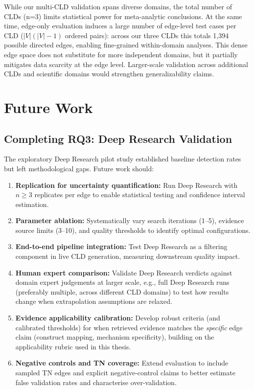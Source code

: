 While our multi-CLD validation spans diverse domains, the total number of CLDs (n=3) limits statistical power for meta-analytic conclusions. At the same time, edge-only evaluation induces a large number of edge-level test cases per CLD ($|V|(|V|-1)$ ordered pairs): across our three CLDs this totals 1,394 possible directed edges, enabling fine-grained within-domain analyses. This dense edge space does not substitute for more independent domains, but it partially mitigates data scarcity at the edge level. Larger-scale validation across additional CLDs and scientific domains would strengthen generalizability claims.

\section{Future Work}
\label{sec:discussion_future}

\subsection{Completing RQ3: Deep Research Validation}

The exploratory Deep Research pilot study established baseline detection rates but left methodological gaps. Future work should:
\begin{enumerate}[noitemsep]
    \item \textbf{Replication for uncertainty quantification:} Run Deep Research with $n \geq 3$ replicates per edge to enable statistical testing and confidence interval estimation.
    \item \textbf{Parameter ablation:} Systematically vary search iterations (1--5), evidence source limits (3--10), and quality thresholds to identify optimal configurations.
    \item \textbf{End-to-end pipeline integration:} Test Deep Research as a filtering component in live CLD generation, measuring downstream quality impact.
    \item \textbf{Human expert comparison:} Validate Deep Research verdicts against domain expert judgements at larger scale, e.g., full Deep Research runs (preferably multiple, across different CLD domains) to test how results change when extrapolation assumptions are relaxed.
    \item \textbf{Evidence applicability calibration:} Develop robust criteria (and calibrated thresholds) for when retrieved evidence matches the \textit{specific} edge claim (construct mapping, mechanism specificity), building on the applicability rubric used in this thesis.
    \item \textbf{Negative controls and TN coverage:} Extend evaluation to include sampled TN edges and explicit negative-control claims to better estimate false validation rates and characterise over-validation.
\end{enumerate}

